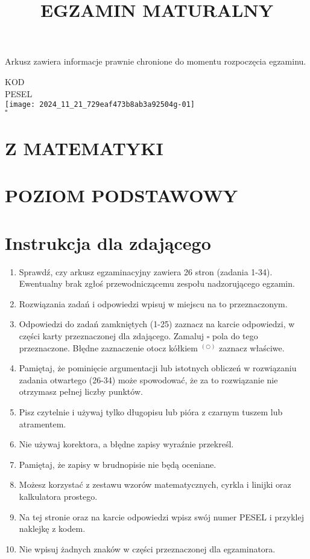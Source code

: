 \documentclass[10pt]{article}
\title{EGZAMIN MATURALNY }
\author{}
\date{}
\begin{document}
\maketitle
Arkusz zawiera informacje prawnie chronione do momentu rozpoczęcia egzaminu.

KOD\\
PESEL\\
\texttt{[image: 2024\_11\_21\_729eaf473b8ab3a92504g-01]}\\
\(\square\)

\section*{Z MATEMATYKI}
\section*{POZIOM PODSTAWOWY}
\section*{Instrukcja dla zdającego}
\begin{enumerate}
  \item Sprawdź, czy arkusz egzaminacyjny zawiera 26 stron (zadania 1-34). Ewentualny brak zgłoś przewodniczącemu zespołu nadzorującego egzamin.
  \item Rozwiązania zadań i odpowiedzi wpisuj w miejscu na to przeznaczonym.
  \item Odpowiedzi do zadań zamkniętych (1-25) zaznacz na karcie odpowiedzi, w części karty przeznaczonej dla zdającego. Zamaluj \(\square\) pola do tego przeznaczone. Błędne zaznaczenie otocz kółkiem \({ }^{(\bigcirc)}\) zaznacz właściwe.
  \item Pamiętaj, że pominięcie argumentacji lub istotnych obliczeń w rozwiązaniu zadania otwartego (26-34) może spowodować, że za to rozwiązanie nie otrzymasz pełnej liczby punktów.
  \item Pisz czytelnie i używaj tylko długopisu lub pióra z czarnym tuszem lub atramentem.
  \item Nie używaj korektora, a błędne zapisy wyraźnie przekreśl.
  \item Pamiętaj, że zapisy w brudnopisie nie będą oceniane.
  \item Możesz korzystać z zestawu wzorów matematycznych, cyrkla i linijki oraz kalkulatora prostego.
  \item Na tej stronie oraz na karcie odpowiedzi wpisz swój numer PESEL i przyklej naklejkę z kodem.
  \item Nie wpisuj żadnych znaków w części przeznaczonej dla egzaminatora.
\end{enumerate}
\end{document}
